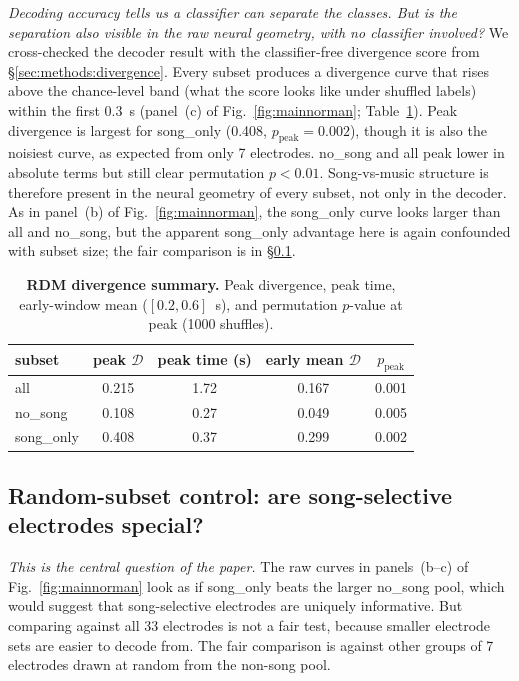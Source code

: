 \documentclass[11pt]{article}
\newcommand{\divg}{\mathcal{D}}
\begin{document}
\emph{Decoding accuracy tells us a classifier can separate the classes. But is the separation also visible in the raw neural geometry, with no classifier involved?} We cross-checked the decoder result with the classifier-free divergence score from \S\ref{sec:methods:divergence}. Every subset produces a divergence curve that rises above the chance-level band (what the score looks like under shuffled labels) within the first 0.3~s (panel~(c) of Fig.~\ref{fig:mainnorman}; Table~\ref{tab:divergence}). Peak divergence is largest for \textsf{song\_only} (0.408, $p_\text{peak} = 0.002$), though it is also the noisiest curve, as expected from only 7 electrodes. \textsf{no\_song} and \textsf{all} peak lower in absolute terms but still clear permutation $p < 0.01$. Song-vs-music structure is therefore present in the neural geometry of every subset, not only in the decoder. As in panel~(b) of Fig.~\ref{fig:mainnorman}, the \textsf{song\_only} curve looks larger than \textsf{all} and \textsf{no\_song}, but the apparent \textsf{song\_only} advantage here is again confounded with subset size; the fair comparison is in \S\ref{sec:randsubset}.

\begin{table}[t]
\centering\small
\caption{\textbf{RDM divergence summary.} Peak divergence, peak time, early-window mean ($[0.2, 0.6]$~s), and permutation $p$-value at peak (1000 shuffles).}
\label{tab:divergence}
\begin{tabular}{lcccc}
\toprule
subset & peak $\divg$ & peak time (s) & early mean $\divg$ & $p_\text{peak}$ \\
\midrule
all        & 0.215 & 1.72 & 0.167 & 0.001 \\
no\_song   & 0.108 & 0.27 & 0.049 & 0.005 \\
song\_only & 0.408 & 0.37 & 0.299 & 0.002 \\
\bottomrule
\end{tabular}
\end{table}

\subsection{Random-subset control: are song-selective electrodes special?}\label{sec:randsubset}

\emph{This is the central question of the paper.} The raw curves in panels~(b--c) of Fig.~\ref{fig:mainnorman} look as if \textsf{song\_only} beats the larger \textsf{no\_song} pool, which would suggest that song-selective electrodes are uniquely informative. But comparing against all 33 electrodes is not a fair test, because smaller electrode sets are easier to decode from. The fair comparison is against other groups of 7 electrodes drawn at random from the non-song pool.
\end{document}
